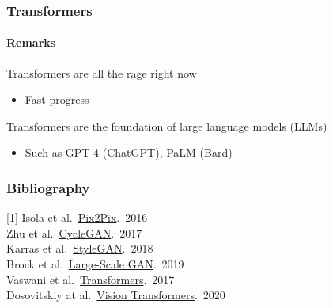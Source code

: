 \documentclass[xetex,professionalfont]{beamer}
\let\oldemph\emph
\renewcommand\emph[1]{\textcolor{tuwcvl_cvl_blue}{#1}}
\begin{document}
\begin{frame}
	\frametitle{Transformers}
	\framesubtitle{Remarks}

	Transformers are all the rage right now
	\begin{itemize}
		\item Fast progress
	\end{itemize}

	\bigskip
	Transformers are the foundation of \emph{large language models} (\emph{LLMs})
	\begin{itemize}
		\item Such as GPT-4 (ChatGPT), PaLM (Bard)
	\end{itemize}

\end{frame}


\renewcommand\emph[1]{\oldemph{#1}}

\begin{frame}
	\frametitle{Bibliography}

	[1] Isola et al.~\href{https://arxiv.org/abs/1611.07004}{Pix2Pix}.~2016\\\medskip
	[2] Zhu et al.~\href{https://arxiv.org/abs/1703.10593}{CycleGAN}.~2017\\\medskip
	[3] Karras et  al.~\href{https://arxiv.org/abs/1812.04948}{StyleGAN}.~2018\\\medskip
	[4] Brock et al.~\href{https://arxiv.org/abs/1809.11096}{Large-Scale GAN}.~2019\\\medskip
	[5] Vaswani et al.~\href{https://arxiv.org/abs/1706.03762v5}{Transformers}.~2017\\\medskip
	[6] Dosovitskiy at al.~\href{https://arxiv.org/abs/2010.11929}{Vision Transformers}.~2020\\\medskip

\end{frame}
\end{document}
